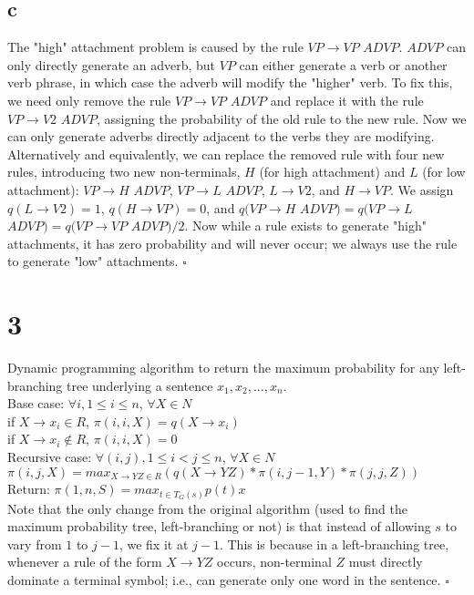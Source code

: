 \documentclass[twoside]{homework}
\begin{document}
\subsection*{c}
The "high" attachment problem is caused by the rule $VP \rightarrow VP$ $ADVP$.  $ADVP$ can only directly generate an adverb, but $VP$ can either generate a verb or another verb phrase, in which case the adverb will modify the "higher" verb.  To fix this, we need only remove the rule $VP \rightarrow VP$ $ADVP$ and replace it with the rule $VP \rightarrow V2$ $ADVP$, assigning the probability of the old rule to the new rule.  Now we can only generate adverbs directly adjacent to the verbs they are modifying.  Alternatively and equivalently, we can replace the removed rule with four new rules, introducing two new non-terminals, $H$ (for high attachment) and $L$ (for low attachment): $VP \rightarrow H$ $ADVP$, $VP \rightarrow L$ $ADVP$, $L \rightarrow V2$, and $H \rightarrow VP$.  We assign $q(L \rightarrow V2) = 1$, $q(H \rightarrow VP) = 0$, and $q(VP \rightarrow H$ $ADVP) = q(VP \rightarrow L$ $ADVP) = q(VP \rightarrow VP$ $ADVP)/2$.  Now while a rule exists to generate "high" attachments, it has zero probability and will never occur; we always use the rule to generate "low" attachments. 
$\square$

\section*{3}
Dynamic programming algorithm to return the maximum probability for any left-branching tree underlying a sentence $x_1,x_2,...,x_n$. \\
Base case: $\forall i, 1 \leq i \leq n$, $\forall X \in N$ \\
\indent if $X \rightarrow x_i \in R$, $\pi(i,i,X) = q(X \rightarrow x_i)$ \\
\indent if $X \rightarrow x_i \notin R$, $\pi(i,i,X) = 0$ \\
Recursive case: $\forall (i,j), 1 \leq i < j \leq n$, $\forall X \in N$ \\
\indent $\pi(i,j,X) = max_{X \rightarrow YZ \in R} (q(X \rightarrow YZ)*\pi(i, j-1,Y)*\pi(j,j,Z))$ \\
Return: $\pi(1,n,S) = max_{t \in T_G(s)} p(t)x$ \\
Note that the only change from the original algorithm (used to find the maximum probability tree, left-branching or not) is that instead of allowing $s$ to vary from $1$ to $j-1$, we fix it at $j-1$.  This is because in a left-branching tree, whenever a rule of the form $X \rightarrow YZ$ occurs, non-terminal $Z$ must directly dominate a terminal symbol; i.e., can generate only one word in the sentence.
$\square$
\end{document}
